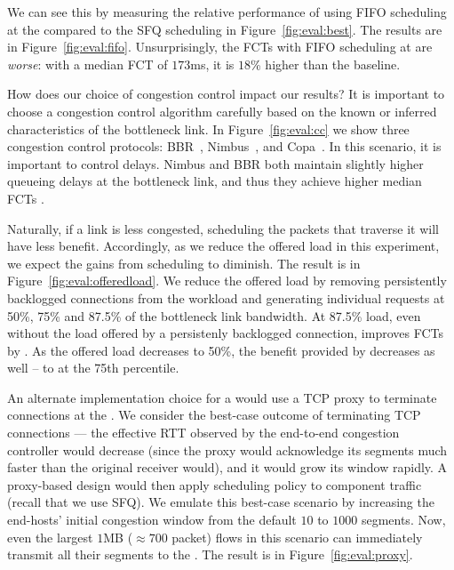 

We can see this by measuring the relative performance of using FIFO scheduling at the \name compared to the SFQ scheduling in Figure~\ref{fig:eval:best}.
The results are in Figure~\ref{fig:eval:fifo}. 
Unsurprisingly, the FCTs with FIFO scheduling at \name are \emph{worse}: with a median FCT of $173$ms, it is $18$\% higher than the baseline.

 How does our choice of congestion control impact our results? 
It is important to choose a congestion control algorithm carefully based on the known or inferred characteristics of the bottleneck link. 
In Figure~\ref{fig:eval:cc} we show three congestion control protocols: BBR~\cite{bbr}, Nimbus~\cite{nimbus}, and Copa~\cite{copa}.
In this scenario, it is important to control delays. Nimbus and BBR both maintain slightly higher queueing delays at the bottleneck link, and thus they achieve higher median FCTs .



 Naturally, if a link is less congested, scheduling the packets that traverse it will have less benefit. Accordingly, as we reduce the offered load in this experiment, we expect the gains from scheduling to diminish. The result is in Figure~\ref{fig:eval:offeredload}. We reduce the offered load by removing persistently backlogged connections from the workload and generating individual requests at 50\%, 75\% and 87.5\% of the bottleneck link bandwidth. 
At 87.5\% load, even without the load offered by a persistenly backlogged connection, \name improves FCTs by . 
As the offered load decreases to 50\%, the benefit provided by \name decreases as well -- to  at the 75th percentile.



 An alternate implementation choice for a \name would use a TCP proxy to terminate connections at the \inbox.
We consider the best-case outcome of terminating TCP connections --- the effective RTT observed by the end-to-end congestion controller would decrease (since the proxy would acknowledge its segments much faster than the original receiver would), and it would grow its window rapidly.
A proxy-based design would then apply scheduling policy to component traffic (recall that we use SFQ).
We emulate this best-case scenario by increasing the end-hosts' initial congestion window from the default $10$ to $1000$ segments.
Now, even the largest $1$MB ($\approx700$ packet) flows in this scenario can immediately transmit all their segments to the \inbox.
The result is in Figure~\ref{fig:eval:proxy}.

